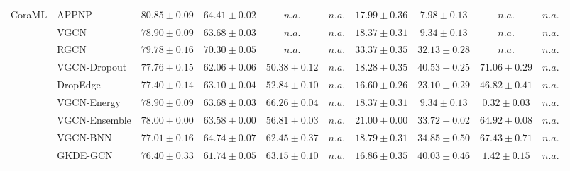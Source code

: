 \begin{table*}[!h]
{\begin{tabular}{ll|cccc|cccc}
        \multirow{10}{*}{CoraML}
        & APPNP & ${80.85\scriptscriptstyle \pm 0.09}$ & ${64.41\scriptscriptstyle \pm 0.02}$ & $n.a.$ & $n.a.$ & ${17.99\scriptscriptstyle \pm 0.36}$ & ${7.98\scriptscriptstyle \pm 0.13}$ & $n.a.$ & $n.a.$\\
        & VGCN & ${78.90\scriptscriptstyle \pm 0.09}$ & ${63.68\scriptscriptstyle \pm 0.03}$ & $n.a.$ & $n.a.$ & ${18.37\scriptscriptstyle \pm 0.31}$ & ${9.34\scriptscriptstyle \pm 0.13}$ & $n.a.$ & $n.a.$\\
        & RGCN & ${79.78\scriptscriptstyle \pm 0.16}$ & ${{70.30}\scriptscriptstyle \pm 0.05}$ & $n.a.$ & $n.a.$ & ${33.37\scriptscriptstyle \pm 0.35}$ & ${32.13\scriptscriptstyle \pm 0.28}$ & $n.a.$ & $n.a.$\\
        & VGCN-Dropout & ${77.76\scriptscriptstyle \pm 0.15}$ & ${62.06\scriptscriptstyle \pm 0.06}$ & ${50.38\scriptscriptstyle \pm 0.12}$ & $n.a.$ & ${18.28\scriptscriptstyle \pm 0.35}$ & ${40.53\scriptscriptstyle \pm 0.25}$ & ${{71.06}\scriptscriptstyle \pm 0.29}$ & $n.a.$\\
        & DropEdge & ${77.40\scriptscriptstyle \pm 0.14}$ & ${63.10\scriptscriptstyle \pm 0.04}$ & ${52.84\scriptscriptstyle \pm 0.10}$ & $n.a.$ & ${16.60\scriptscriptstyle \pm 0.26}$ & ${23.10\scriptscriptstyle \pm 0.29}$ & ${46.82\scriptscriptstyle \pm 0.41}$ & $n.a.$\\
        & VGCN-Energy & ${78.90\scriptscriptstyle \pm 0.09}$ & ${63.68\scriptscriptstyle \pm 0.03}$ & ${{66.26}\scriptscriptstyle \pm 0.04}$ & $n.a.$ & ${18.37\scriptscriptstyle \pm 0.31}$ & ${9.34\scriptscriptstyle \pm 0.13}$ & ${0.32\scriptscriptstyle \pm 0.03}$ & $n.a.$\\
        & VGCN-Ensemble & ${78.00\scriptscriptstyle \pm 0.00}$ & ${63.58\scriptscriptstyle \pm 0.00}$ & ${56.81\scriptscriptstyle \pm 0.03}$ & $n.a.$ & ${21.00\scriptscriptstyle \pm 0.00}$ & ${33.72\scriptscriptstyle \pm 0.02}$ & ${64.92\scriptscriptstyle \pm 0.08}$ & $n.a.$\\
        & VGCN-BNN & ${77.01\scriptscriptstyle \pm 0.16}$ & ${64.74\scriptscriptstyle \pm 0.07}$ & ${62.45\scriptscriptstyle \pm 0.37}$ & $n.a.$ & ${18.79\scriptscriptstyle \pm 0.31}$ & ${34.85\scriptscriptstyle \pm 0.50}$ & ${67.43\scriptscriptstyle \pm 0.71}$ & $n.a.$\\
        & GKDE-GCN & ${76.40\scriptscriptstyle \pm 0.33}$ & ${61.74\scriptscriptstyle \pm 0.05}$ & ${63.15\scriptscriptstyle \pm 0.10}$ & $n.a.$ & ${16.86\scriptscriptstyle \pm 0.35}$ & ${40.03\scriptscriptstyle \pm 0.46}$ & ${1.42\scriptscriptstyle \pm 0.15}$ & $n.a.$\\

\end{tabular}}
\end{table*}
